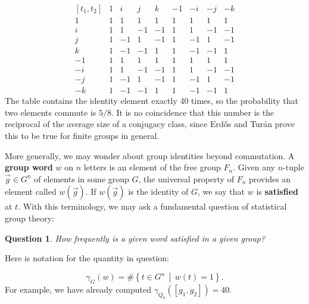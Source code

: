 \documentclass[12pt]{article}
\newtheorem{que}[thm]{Question}
\newcommand{\be}{\begin{equation}}
\newcommand{\ee}{\end{equation}}
\begin{document}
\be
\begin{array}{r|cccccccc}
 [t_1,t_2] & 1 & i & j & k & -1 & -i & -j & -k \\
 \hline
 1 & 1 & 1 & 1 & 1 & 1 & 1 & 1 & 1 \\
 i & 1 & 1 & -1 & -1 & 1 & 1 & -1 & -1 \\
 j & 1 & -1 & 1 & -1 & 1 & -1 & 1 & -1 \\
 k & 1 & -1 & -1 & 1 & 1 & -1 & -1 & 1 \\
 -1 & 1 & 1 & 1 & 1 & 1 & 1 & 1 & 1 \\
 -i & 1 & 1 & -1 & -1 & 1 & 1 & -1 & -1 \\
 -j & 1 & -1 & 1 & -1 & 1 & -1 & 1 & -1 \\
 -k & 1 & -1 & -1 & 1 & 1 & -1 & -1 & 1
\end{array}
\ee
The table contains the identity element exactly 40 times, so the probability that two elements commute is $5/8$.  It is no coincidence that this number is the reciprocal of the average size of a conjugacy class, since Erd\H{o}s and Tur\'{a}n \cite{erdos} prove this to be true for finite groups in general.

More generally, we may wonder about group identities beyond commutation.  A \textbf{group word} $w$ on $n$ letters is an element of the free group $F_n$.  Given any $n$-tuple $\vec{g} \in G^n$ of elements in some group $G$, the universal property of $F_n$ provides an element called $w(\vec{g})$.  If $w(\vec{g})$ is the identity of $G$, we say that $w$ is \textbf{satisfied} at $t$.  With this terminology, we may ask a fundamental question of statistical group theory:
\begin{que} How frequently is a given word satisfied in a given group?
\end{que}

\noindent Here is notation for the quantity in question:

\be \gamma_G(w) = \# \left\{ t \in G^n \, \middle| \, w(t) = 1 \right\} . \ee
For example, we have already computed $\gamma_{Q_8} ([g_1,g_2]) = 40$.

\end{document}
